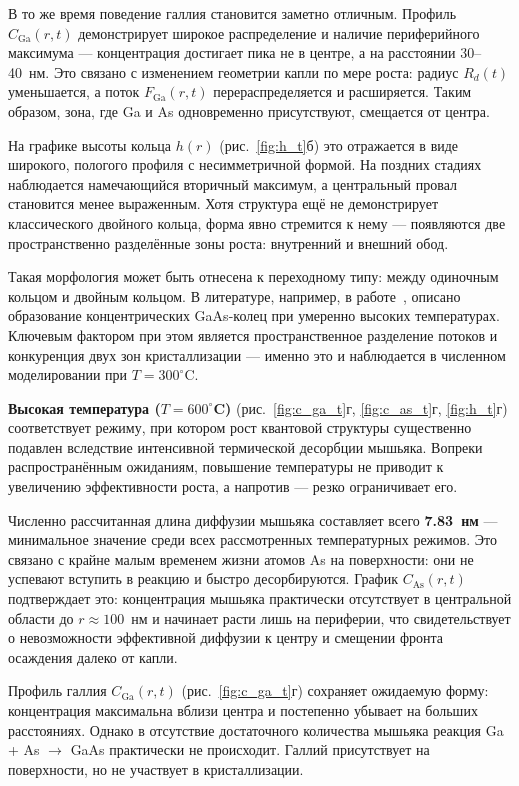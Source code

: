 \documentclass[14pt,oneside]{extarticle}
\begin{document}
В то же время поведение галлия становится заметно отличным. Профиль $C_{\text{Ga}}(r, t)$ демонстрирует широкое распределение и наличие периферийного максимума — концентрация достигает пика не в центре, а на расстоянии 30–40~нм. Это связано с изменением геометрии капли по мере роста: радиус \( R_d(t) \) уменьшается, а поток $F_{\text{Ga}}(r, t)$ перераспределяется и расширяется. Таким образом, зона, где Ga и As одновременно присутствуют, смещается от центра.

На графике высоты кольца $h(r)$ (рис.~\ref{fig:h_t}б) это отражается в виде широкого, пологого профиля с несимметричной формой. На поздних стадиях наблюдается намечающийся вторичный максимум, а центральный провал становится менее выраженным. Хотя структура ещё не демонстрирует классического двойного кольца, форма явно стремится к нему — появляются две пространственно разделённые зоны роста: внутренний и внешний обод.

Такая морфология может быть отнесена к переходному типу: между одиночным кольцом и двойным кольцом. В литературе, например, в работе~\cite{mano2005self}, описано образование концентрических GaAs-колец при умеренно высоких температурах. Ключевым фактором при этом является пространственное разделение потоков и конкуренция двух зон кристаллизации — именно это и наблюдается в численном моделировании при $T = 300^\circ$C.

\textbf{Высокая температура ($T = 600^\circ$C)} (рис.~\ref{fig:c_ga_t}г, \ref{fig:c_as_t}г, \ref{fig:h_t}г) соответствует режиму, при котором рост квантовой структуры существенно подавлен вследствие интенсивной термической десорбции мышьяка. Вопреки распространённым ожиданиям, повышение температуры не приводит к увеличению эффективности роста, а напротив — резко ограничивает его.

Численно рассчитанная длина диффузии мышьяка составляет всего \textbf{7.83~нм} — минимальное значение среди всех рассмотренных температурных режимов. Это связано с крайне малым временем жизни атомов As на поверхности: они не успевают вступить в реакцию и быстро десорбируются. График $C_{\text{As}}(r, t)$ подтверждает это: концентрация мышьяка практически отсутствует в центральной области до $r \approx 100$~нм и начинает расти лишь на периферии, что свидетельствует о невозможности эффективной диффузии к центру и смещении фронта осаждения далеко от капли.

Профиль галлия $C_{\text{Ga}}(r, t)$ (рис.~\ref{fig:c_ga_t}г) сохраняет ожидаемую форму: концентрация максимальна вблизи центра и постепенно убывает на больших расстояниях. Однако в отсутствие достаточного количества мышьяка реакция Ga + As $\rightarrow$ GaAs практически не происходит. Галлий присутствует на поверхности, но не участвует в кристаллизации.
\end{document}
